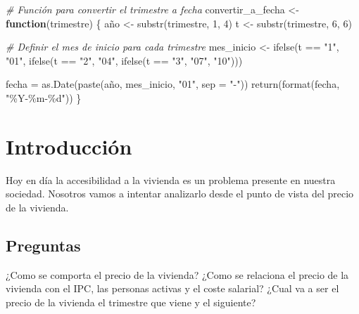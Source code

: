 \documentclass[
]{article}
\newenvironment{Shaded}{\begin{snugshade}}{\end{snugshade}}
\newcommand{\AttributeTok}[1]{\textcolor[rgb]{0.77,0.63,0.00}{#1}}
\newcommand{\CommentTok}[1]{\textcolor[rgb]{0.56,0.35,0.01}{\textit{#1}}}
\newcommand{\ControlFlowTok}[1]{\textcolor[rgb]{0.13,0.29,0.53}{\textbf{#1}}}
\newcommand{\DecValTok}[1]{\textcolor[rgb]{0.00,0.00,0.81}{#1}}
\newcommand{\FunctionTok}[1]{\textcolor[rgb]{0.00,0.00,0.00}{#1}}
\newcommand{\NormalTok}[1]{#1}
\newcommand{\OtherTok}[1]{\textcolor[rgb]{0.56,0.35,0.01}{#1}}
\newcommand{\SpecialCharTok}[1]{\textcolor[rgb]{0.00,0.00,0.00}{#1}}
\newcommand{\StringTok}[1]{\textcolor[rgb]{0.31,0.60,0.02}{#1}}
\begin{document}
\begin{Shaded}
\begin{Highlighting}[]
\CommentTok{\# Función para convertir el trimestre a fecha}
\NormalTok{convertir\_a\_fecha }\OtherTok{\textless{}{-}} \ControlFlowTok{function}\NormalTok{(trimestre) \{}
\NormalTok{  año }\OtherTok{\textless{}{-}} \FunctionTok{substr}\NormalTok{(trimestre, }\DecValTok{1}\NormalTok{, }\DecValTok{4}\NormalTok{)}
\NormalTok{  t }\OtherTok{\textless{}{-}} \FunctionTok{substr}\NormalTok{(trimestre, }\DecValTok{6}\NormalTok{, }\DecValTok{6}\NormalTok{)}
  
  \CommentTok{\# Definir el mes de inicio para cada trimestre}
\NormalTok{  mes\_inicio }\OtherTok{\textless{}{-}} \FunctionTok{ifelse}\NormalTok{(t }\SpecialCharTok{==} \StringTok{"1"}\NormalTok{, }\StringTok{"01"}\NormalTok{, }
                       \FunctionTok{ifelse}\NormalTok{(t }\SpecialCharTok{==} \StringTok{"2"}\NormalTok{, }\StringTok{"04"}\NormalTok{, }
                              \FunctionTok{ifelse}\NormalTok{(t }\SpecialCharTok{==} \StringTok{"3"}\NormalTok{, }\StringTok{"07"}\NormalTok{, }\StringTok{"10"}\NormalTok{)))}
  
\NormalTok{  fecha }\OtherTok{=} \FunctionTok{as.Date}\NormalTok{(}\FunctionTok{paste}\NormalTok{(año, mes\_inicio, }\StringTok{"01"}\NormalTok{, }\AttributeTok{sep =} \StringTok{"{-}"}\NormalTok{))}
  \FunctionTok{return}\NormalTok{(}\FunctionTok{format}\NormalTok{(fecha, }\StringTok{"\%Y{-}\%m{-}\%d"}\NormalTok{))}
\NormalTok{\}}
\end{Highlighting}
\end{Shaded}

\hypertarget{introducciuxf3n}{%
\section{Introducción}\label{introducciuxf3n}}

Hoy en día la accesibilidad a la vivienda es un problema presente en
nuestra sociedad. Nosotros vamos a intentar analizarlo desde el punto de
vista del precio de la vivienda.

\hypertarget{preguntas}{%
\subsection{Preguntas}\label{preguntas}}

¿Como se comporta el precio de la vivienda? ¿Como se relaciona el precio
de la vivienda con el IPC, las personas activas y el coste salarial?
¿Cual va a ser el precio de la vivienda el trimestre que viene y el
siguiente?
\end{document}
